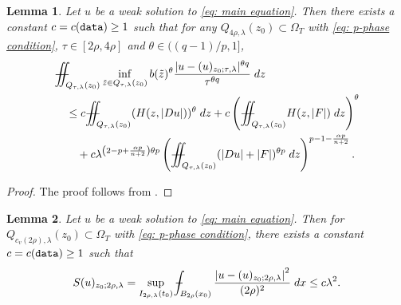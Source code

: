 \documentclass[11pt,oneside, english,reqno,twoside a4paper]{amsart}
\newtheorem{lemma}{Lemma}[section]
\theoremstyle{definition}
\numberwithin{theorem}{section}
\numberwithin{equation}{section}
\def\Xint#1{\mathchoice
	{\XXint\displaystyle\textstyle{#1}}%
	{\XXint\textstyle\scriptstyle{#1}}%
	{\XXint\scriptstyle\scriptscriptstyle{#1}}%
	{\XXint\scriptscriptstyle\scriptscriptstyle{#1}}%
	\!\int}
\def\XXint#1#2#3{{\setbox0=\hbox{$#1{#2#3}{\int}$}
		\vcenter{\hbox{$#2#3$}}\kern-.50\wd0}}
\def\dashint{\Xint-}
\newcommand{\iintss}{{\int\hspace{-0.28cm}\int}}
\newcommand{ \miints }{{\iintss\hspace{-0.56cm} -\hspace{-0.15cm}-}}
\newcommand{\miint}[1]{{\miints_{\hspace{-0.13cm}#1}}}
\begin{document}
\begin{lemma} \label{lem: s-term of parabolic poincare inequality on p-intrinsic cylinders}
Let $u$ be a weak solution to \eqref{eq: main equation}. Then there exists a constant $c=c(\textnormal{\texttt{data}}) \geq 1$ such that for any $Q_{4\rho,\lambda}(z_0)\subset \Omega_T$ with \eqref{eq: p-phase condition}, $\tau \in [2\rho,4\rho]$ and $\theta \in ((q-1)/p,1]$, 
\begin{align*}
&\miint{Q_{\tau,\lambda}(z_0)} \inf_{\tilde{z}\in Q_{\tau,\lambda}(z_0)}b(\tilde{z})^\theta\frac{|u-(u)_{z_0;\tau,\lambda}|^{\theta q}}{\tau^{\theta q}}\; dz \\
&\quad \leq c \miint{Q_{\tau,\lambda}(z_0)}(H(z,|Du|))^{\theta}\; dz +c\left(\miint{Q_{\tau,\lambda}(z_0)}H(z,|F|)\; d z\right)^{\theta} \\
&\qquad +c \lambda^{\left(2-p+\frac{\alpha p}{n+2}\right)\theta p} \left(\miint{Q_{\tau,\lambda}(z_0)} (|Du|+|F|)^{\theta p}\; dz\right)^{p-1-\frac{\alpha p}{n+2}}.
\end{align*}
\end{lemma}
\begin{proof}
    The proof follows from \cite[Lemma 3.3]{2023_Gradient_Higher_Integrability_for_Degenerate_Parabolic_Double-Phase_Systems}.
\end{proof}
\begin{lemma}\label{lem : Lemma 5.1}
    Let $u$ be a weak solution to \eqref{eq: main equation}. Then for $Q_{c_v(2 \rho),\lambda}(z_0) \subset \Omega_T$ with \eqref{eq: p-phase condition}, there exists a constant $c=c(\textnormal{\texttt{data}}) \geq 1$ such that
    $$
    S(u)_{z_0 ; 2 \rho,\lambda}=\sup _{I_{2 \rho,\lambda}(t_0)} \dashint_{B_{2 \rho}(x_0)} \frac{\left|u-(u)_{z_0 ; 2 \rho,\lambda}\right|^2}{(2 \rho)^2}\; dx \leq c \lambda^2 .
    $$
\end{lemma}
\end{document}
